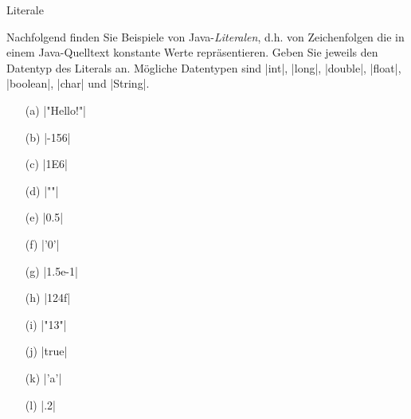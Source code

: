 \begin{exercise}{Literale}

\begin{body}
Nachfolgend finden Sie Beispiele von Java-\emph{Literalen}, d.h. von Zeichenfolgen die in einem Java-Quelltext konstante Werte repräsentieren. Geben Sie jeweils den Datentyp des Literals an. Mögliche Datentypen sind
\code|int|, \code|long|, \code|double|, \code|float|, \code|boolean|, \code|char| und \code|String|.
\begin{center}
\begin{minipage}{0.3\textwidth}
\begin{itemize}
\item[(a)] \code|"Hello!"|
\item[(b)] \code|-156|
\item[(c)] \code|1E6|
\item[(d)] \code|""|
\end{itemize}
\end{minipage}
\begin{minipage}{0.3\textwidth}
\begin{itemize}
\item[(e)] \code|0.5|
\item[(f)] \code|'0'|
\item[(g)] \code|1.5e-1|
\item[(h)] \code|124f|
\end{itemize}
\end{minipage}
\begin{minipage}{0.3\textwidth}
\begin{itemize}
\item[(i)] \code|"13"|
\item[(j)] \code|true|
\item[(k)] \code|'a'|
\item[(l)] \code|.2|
\end{itemize}
\end{minipage}
\end{center}
\end{body}


\end{exercise}
